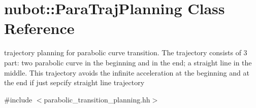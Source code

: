 \hypertarget{classnubot_1_1ParaTrajPlanning}{\section{nubot\-:\-:Para\-Traj\-Planning Class Reference}
\label{classnubot_1_1ParaTrajPlanning}
}


trajectory planning for parabolic curve transition. The trajectory consists of 3 part\-: two parabolic curve in the beginning and in the end; a straight line in the middle. This trajectory avoids the infinite acceleration at the beginning and at the end if just sepcify straight line trajectory  




{\ttfamily \#include $<$parabolic\-\_\-transition\-\_\-planning.\-hh$>$}

